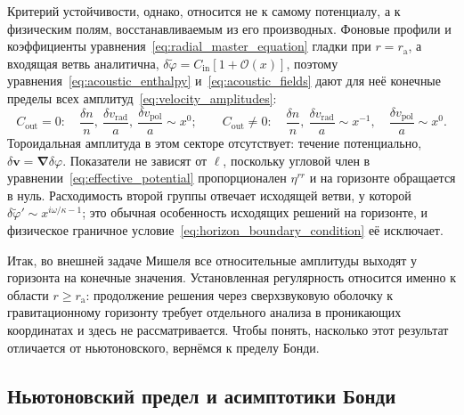 \documentclass[12pt,a4paper,preprint,nopreprintline]{elsarticle}
\begin{document}
Критерий устойчивости, однако, относится не к самому потенциалу, а к физическим полям, восстанавливаемым из его производных. Фоновые профили и коэффициенты уравнения~\eqref{eq:radial_master_equation} гладки при $r=r_{\mathrm{a}}$, а входящая ветвь аналитична, $\delta\widetilde{\varphi}=C_{\mathrm{in}}\left[1+\mathcal{O}(x)\right]$, поэтому уравнения~\eqref{eq:acoustic_enthalpy} и~\eqref{eq:acoustic_fields} дают для неё конечные пределы всех амплитуд~\eqref{eq:velocity_amplitudes}:
\begin{equation}
    C_{\mathrm{out}}=0:
    \quad
    \frac{\delta n}{n},\
    \frac{\delta v_{\mathrm{rad}}}{a},\
    \frac{\delta v_{\mathrm{pol}}}{a}
    \sim x^{0};
    \qquad
    C_{\mathrm{out}}\neq0:
    \quad
    \frac{\delta n}{n},\
    \frac{\delta v_{\mathrm{rad}}}{a}
    \sim x^{-1},
    \quad
    \frac{\delta v_{\mathrm{pol}}}{a}
    \sim x^{0}.
    \label{eq:michel_acoustic_horizon_asymptotics}
\end{equation}
Тороидальная амплитуда в этом секторе отсутствует: течение потенциально, $\delta\boldsymbol{v}=\boldsymbol{\nabla}\delta\varphi$. Показатели не зависят от $\ell$, поскольку угловой член в уравнении~\eqref{eq:effective_potential} пропорционален $\eta^{rr}$ и на горизонте обращается в нуль. Расходимость второй группы отвечает исходящей ветви, у которой $\delta\widetilde{\varphi}'\sim x^{i\omega/\kappa-1}$; это обычная особенность исходящих решений на горизонте, и физическое граничное условие~\eqref{eq:horizon_boundary_condition} её исключает.

Итак, во внешней задаче Мишеля все относительные амплитуды выходят у горизонта на конечные значения. Установленная регулярность относится именно к области $r\geq r_{\mathrm{a}}$: продолжение решения через сверхзвуковую оболочку к гравитационному горизонту требует отдельного анализа в проникающих координатах и здесь не рассматривается. Чтобы понять, насколько этот результат отличается от ньютоновского, вернёмся к пределу Бонди.

\subsection{Ньютоновский предел и асимптотики Бонди}
\label{sec:newtonian_bondi_acoustic}
\end{document}
